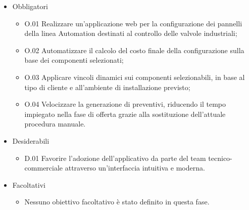 \begin{itemize}
	\item Obbligatori
	\begin{itemize}
		\item O.01 Realizzare un’applicazione web per la configurazione dei pannelli della linea Automation destinati al controllo delle valvole industriali;
		\item O.02 Automatizzare il calcolo del costo finale della configurazione sulla base dei componenti selezionati;
		\item O.03 Applicare vincoli dinamici sui componenti selezionabili, in base al tipo di cliente e all’ambiente di installazione previsto;
		\item O.04 Velocizzare la generazione di preventivi, riducendo il tempo impiegato nella fase di offerta grazie alla sostituzione dell’attuale procedura manuale.
	\end{itemize}
	
	\item Desiderabili 
	\begin{itemize}
		\item D.01 Favorire l’adozione dell’applicativo da parte del team tecnico-commerciale attraverso un’interfaccia intuitiva e moderna.
	\end{itemize}
	
	\item Facoltativi
	\begin{itemize}
		\item Nessuno obiettivo facoltativo è stato definito in questa fase.
	\end{itemize} 
\end{itemize}

\newpage
